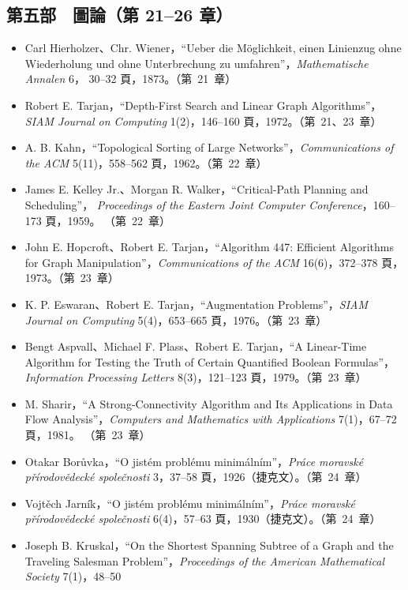 \subsection*{第五部　圖論（第 21--26 章）}

\begin{itemize}
\item Carl Hierholzer、Chr. Wiener，``Ueber die Möglichkeit, einen Linienzug ohne
Wiederholung und ohne Unterbrechung zu umfahren''，\textit{Mathematische Annalen} 6，
30--32 頁，1873。（第~21~章）
\item Robert E. Tarjan，``Depth-First Search and Linear Graph Algorithms''，\textit{SIAM
Journal on Computing} 1(2)，146--160 頁，1972。（第~21、23~章）
\item A. B. Kahn，``Topological Sorting of Large Networks''，\textit{Communications of the
ACM} 5(11)，558--562 頁，1962。（第~22~章）
\item James E. Kelley Jr.、Morgan R. Walker，``Critical-Path Planning and Scheduling''，
\textit{Proceedings of the Eastern Joint Computer Conference}，160--173 頁，1959。
（第~22~章）
\item John E. Hopcroft、Robert E. Tarjan，``Algorithm 447: Efficient Algorithms for Graph
Manipulation''，\textit{Communications of the ACM} 16(6)，372--378 頁，1973。（第~23~章）
\item K. P. Eswaran、Robert E. Tarjan，``Augmentation Problems''，\textit{SIAM Journal on
Computing} 5(4)，653--665 頁，1976。（第~23~章）
\item Bengt Aspvall、Michael F. Plass、Robert E. Tarjan，``A Linear-Time Algorithm for
Testing the Truth of Certain Quantified Boolean Formulas''，\textit{Information Processing
Letters} 8(3)，121--123 頁，1979。（第~23~章）
\item M. Sharir，``A Strong-Connectivity Algorithm and Its Applications in Data Flow
Analysis''，\textit{Computers and Mathematics with Applications} 7(1)，67--72 頁，1981。
（第~23~章）
\item Otakar Borůvka，``O jistém problému minimálním''，\textit{Práce moravské
přírodovědecké společnosti} 3，37--58 頁，1926（捷克文）。（第~24~章）
\item Vojtěch Jarník，``O jistém problému minimálním''，\textit{Práce moravské
přírodovědecké společnosti} 6(4)，57--63 頁，1930（捷克文）。（第~24~章）
\item Joseph B. Kruskal，``On the Shortest Spanning Subtree of a Graph and the Traveling
Salesman Problem''，\textit{Proceedings of the American Mathematical Society} 7(1)，48--50

\end{itemize}
